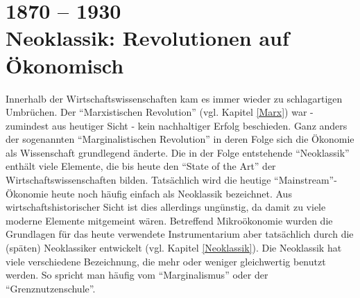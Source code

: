 %
%
%


\part{1870 -- 1930\\Neoklassik: Revolutionen auf Ökonomisch}

Innerhalb der Wirtschaftswissenschaften kam es immer wieder zu schlagartigen Umbrüchen. Der "`Marxistischen Revolution"' (vgl. Kapitel \ref{Marx}) war - zumindest aus heutiger Sicht - kein nachhaltiger Erfolg beschieden. Ganz anders der sogenannten "`Marginalistischen Revolution"' in deren Folge sich die Ökonomie als Wissenschaft grundlegend änderte. Die in der Folge entstehende "`Neoklassik"' enthält viele Elemente, die bis heute den "`State of the Art"' der Wirtschaftswissenschaften bilden. Tatsächlich wird die heutige "`Mainstream"'-Ökonomie heute noch häufig einfach als Neoklassik bezeichnet. Aus wirtschaftshistorischer Sicht ist dies allerdings ungünstig, da damit zu viele moderne Elemente mitgemeint wären. Betreffend Mikroökonomie wurden die Grundlagen für das heute verwendete Instrumentarium aber tatsächlich durch die (späten) Neoklassiker entwickelt (vgl. Kapitel \ref{Neoklassik}). Die Neoklassik hat viele verschiedene Bezeichnung, die mehr oder weniger gleichwertig benutzt werden. So spricht man häufig vom "`Marginalismus"' oder der "`Grenznutzenschule"'.

